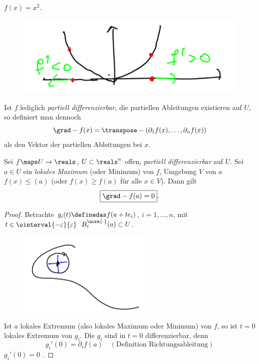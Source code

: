 \begin{beispiel*}
    \( f(x)=x^2 \).
    \begin{figure}[H]
        \centering
        \includegraphics[width=0.4\linewidth]{figures/gradient_beispiel_parabel_2d}
        \caption*{}
        \label{fig:gradient_beispiel_parabel_2d}
    \end{figure}
    Ist \( f \) lediglich \emph{partiell differenzierbar}, \dh  die partiellen Ableitungen existieren auf \( U \), so definiert man dennoch
    \begin{equation*}
        \grad-{f(x)}=\transpose-{(\partial_1 f(x),\dotsc, \partial_n f(x))}
    \end{equation*}
    als den Vektor der partiellen Ableitungen bei \( x \).
\end{beispiel*}
\begin{satz}\label{extremum_notwendige_bedingung}
    Sei \( f\maps U\to \reals \), \( U\subset \reals^n \) offen, \emph{partiell differenzierbar} auf \( U \). Sei \( a\in U \) ein \emph{lokales Maximum} (oder Minimum) von \( f \), \dh  \texists Umgebung \( V \) von \( a \) \sd \( f(x)\leq (a) \) (oder \( f(x)\geq f(a) \) für alle \( x\in V \)). Dann gilt
    \begin{equation*}
        \boxed{\grad-{f(a)}=0}.
    \end{equation*} 
\end{satz}
\begin{proof}
    Betrachte \( g_i(t)\definedas f(a+t e_i) \), \( i=1,\dotsc, n \), mit \( t\in \ointerval{-\varepsilon}{\varepsilon} \) \sd \( B_{\varepsilon}^{\norm{\cdot}}(a)\subset U \).
    \begin{figure}[H]
        \centering
        \includegraphics[width=0.5\linewidth]{figures/extrema_notwendige_bedingung_beweis_umgebung}
        \label{fig:extrema_notwendige_bedingung_beweis_umgebung}
    \end{figure}
    Ist \( a \) lokales Extremum (also lokales Maximum oder Minimum) von \( f\), so ist \( t=0 \) lokales Extremum von \( g_i \). Die \( g_i \) sind in \( t=0 \) differenzierbar, denn
    \begin{equation*}
        g_i'(0)=\partial_i f(a)\quad (\text{Definition Richtungsableitung})
    \end{equation*}
     \timplies \( g_i'(0)=0 \) \timplies \Beh.
\end{proof}
